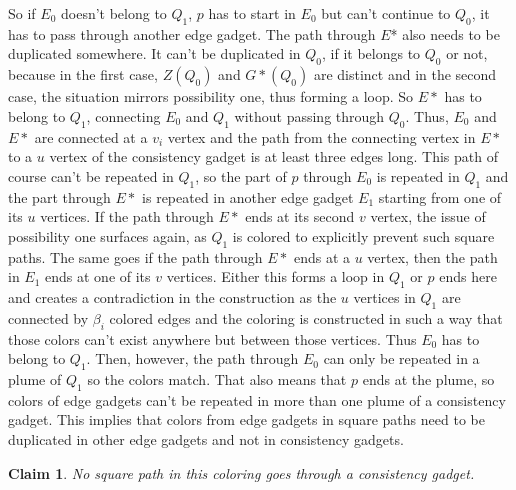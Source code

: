 \documentclass[12pt,a4paper]{article}
\newtheorem{claim}{Claim}
\begin{document}
So if $E_0$ doesn't belong to $Q_1$, $p$ has to start in $E_0$ but can't continue to $Q_0$, it has to pass through another edge gadget. The path through $E$* also needs to be duplicated somewhere. It can't be duplicated in $Q_0$, if it belongs to $Q_0$ or not, because in the first case, $Z(Q_0)$ and $G*(Q_0)$ are distinct and in the second case, the situation mirrors possibility one, thus forming a loop. So $E*$ has to belong to $Q_1$, connecting $E_0$ and $Q_1$ without passing through $Q_0$. Thus, $E_0$ and $E*$ are connected at a $v_i$ vertex and the path from the connecting vertex in $E*$ to a $u$ vertex of the consistency gadget is at least three edges long. This path of course can't be repeated in $Q_1$, so the part of $p$ through $E_0$ is repeated in $Q_1$ and the part through $E*$ is repeated in another edge gadget $E_1$ starting from one of its $u$ vertices. If the path through $E*$ ends at its second $v$ vertex, the issue of possibility one surfaces again, as $Q_1$ is colored to explicitly prevent such square paths. The same goes if the path through $E*$ ends at a $u$ vertex, then the path in $E_1$ ends at one of its $v$ vertices. Either this forms a loop in $Q_1$ or $p$ ends here and creates a contradiction in the construction as the $u$ vertices in $Q_1$ are connected by $\beta_i$ colored edges and the coloring is constructed in such a way that those colors can't exist anywhere but between those vertices.
\newline
Thus $E_0$ has to belong to $Q_1$. Then, however, the path through $E_0$ can only be repeated in a plume of $Q_1$ so the colors match. That also means that $p$ ends at the plume, so colors of edge gadgets can't be repeated in more than one plume of a consistency gadget. This implies that colors from edge gadgets in square paths need to be duplicated in other edge gadgets and not in consistency gadgets.
  
\begin{claim}
No square path in this coloring goes through a consistency gadget.
\end{claim}
\end{document}
